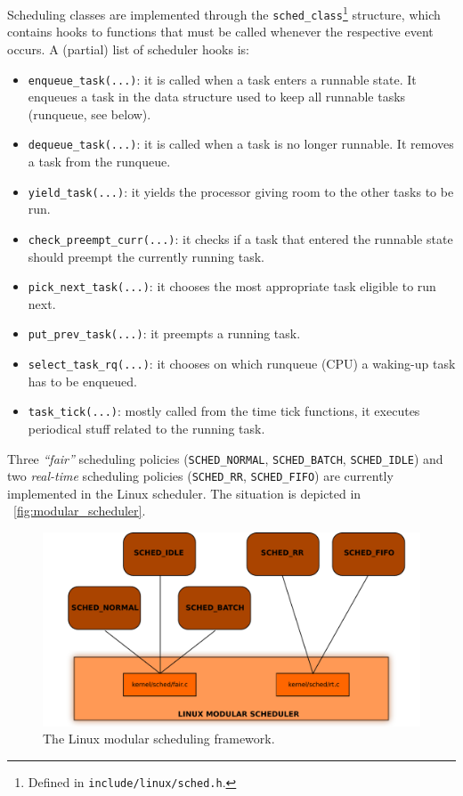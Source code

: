 Scheduling classes are implemented through the \texttt{sched\_class}\footnote{
Defined in \texttt{include/linux/sched.h}.} structure, which contains hooks to
functions that must be called whenever the respective event occurs. A (partial)
list of scheduler hooks is:
\begin{itemize}
\item \texttt{enqueue\_task(...)}: it is called when a task enters a runnable state.
It enqueues a task in the data structure used to keep all runnable tasks
(runqueue, see below).
\item \texttt{dequeue\_task(...)}: it is called when a task is no longer runnable. It
removes a task from the runqueue.
\item \texttt{yield\_task(...)}: it yields the processor giving room to the
other tasks to be run.
\item \texttt{check\_preempt\_curr(...)}: it checks if a task that entered the
runnable state should preempt the currently running task.
\item \texttt{pick\_next\_task(...)}: it chooses the most appropriate task
eligible to run next.
\item \texttt{put\_prev\_task(...)}: it preempts a running task.
\item \texttt{select\_task\_rq(...)}: it chooses on which runqueue (CPU) a
waking-up task has to be enqueued.
\item \texttt{task\_tick(...)}: mostly called from the time tick functions,
it executes periodical stuff related  to the running task.
\end{itemize}
Three \emph{``fair''} scheduling policies
(\texttt{SCHED\_NORMAL}, \texttt{SCHED\_BATCH}, \texttt{SCHED\_IDLE}) and two
\emph{real-time} scheduling policies (\texttt{SCHED\_RR}, \texttt{SCHED\_FIFO}) are currently implemented in the Linux scheduler.
The situation is depicted in \figurename~\vref{fig:modular_scheduler}.

\begin{figure}[htbp]
    \includegraphics[width=\columnwidth]{images/modular_scheduler}
    \caption{The Linux modular scheduling framework.}
    \label{fig:modular_scheduler}
\end{figure}

